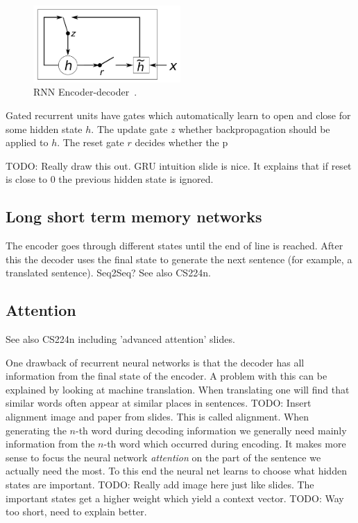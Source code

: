 \begin{figure}[htbp]
    \begin{center}
        \includegraphics[width=0.5\textwidth]{figures/gru.png}
    \end{center}
    \caption{RNN Encoder-decoder~\cite[Figure 2]{cho2014learning}.}
    \label{fig:gru}
\end{figure}

Gated recurrent units have gates which automatically learn to open and close for some hidden state $h$.
The update gate $z$ whether backpropagation should be applied to $h$.
The reset gate $r$ decides whether the p

TODO: Really draw this out.
GRU intuition slide is nice.
It explains that if reset is close to 0 the previous hidden state is ignored.

\subsection{Long short term memory networks}
\label{subsec:lstm}

The encoder goes through different states until the end of line is reached.
After this the decoder uses the final state to generate the next sentence (for example, a translated sentence).
Seq2Seq?
See also CS224n.

\subsection{Attention}
\label{subsec:attention}
See also CS224n including 'advanced attention' slides.

One drawback of recurrent neural networks is that the decoder has all information from the final state of the encoder.
A problem with this can be explained by looking at machine translation.
When translating one will find that similar words often appear at similar places in sentences.
TODO: Insert alignment image and paper from slides.
This is called alignment.
When generating the $n$-th word during decoding information we generally need mainly information from the $n$-th word which occurred during encoding.
It makes more sense to focus the neural network \textit{attention} on the part of the sentence we actually need the most.
To this end the neural net learns to choose what hidden states are important.
TODO: Really add image here just like slides.
The important states get a higher weight which yield a context vector.
TODO: Way too short, need to explain better.

